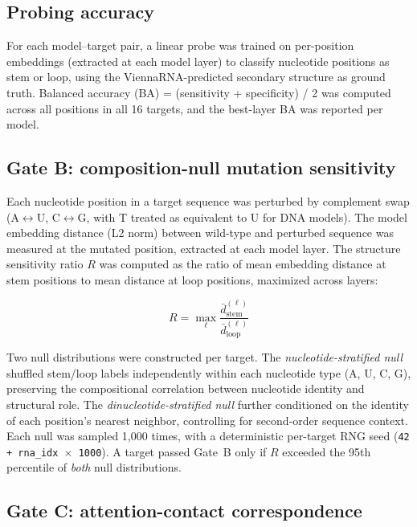 \documentclass[11pt]{article}
\begin{document}
\subsection{Probing accuracy}

For each model--target pair, a linear probe was trained on per-position
embeddings (extracted at each model layer) to classify nucleotide positions
as stem or loop, using the ViennaRNA-predicted secondary structure as ground
truth. Balanced accuracy (BA) = (sensitivity + specificity) / 2 was computed
across all positions in all 16 targets, and the best-layer BA was reported
per model.

\subsection{Gate B: composition-null mutation sensitivity}

Each nucleotide position in a target sequence was perturbed by complement
swap (A$\leftrightarrow$U, C$\leftrightarrow$G, with T treated as equivalent
to U for DNA models). The model embedding distance (L2 norm) between
wild-type and perturbed sequence was measured at the mutated position,
extracted at each model layer. The structure sensitivity ratio $R$ was
computed as the ratio of mean embedding distance at stem positions to mean
distance at loop positions, maximized across layers:

\begin{equation}
R = \max_{\ell} \frac{\bar{d}_{\text{stem}}^{(\ell)}}{\bar{d}_{\text{loop}}^{(\ell)}}
\end{equation}

Two null distributions were constructed per target. The
\emph{nucleotide-stratified null} shuffled stem/loop labels independently
within each nucleotide type (A, U, C, G), preserving the compositional
correlation between nucleotide identity and structural role. The
\emph{dinucleotide-stratified null} further conditioned on the identity of
each position's nearest neighbor, controlling for second-order sequence
context. Each null was sampled 1,000 times, with a deterministic per-target
RNG seed (\texttt{42 + rna\_idx $\times$ 1000}). A target passed Gate~B only
if $R$ exceeded the 95th percentile of \emph{both} null distributions.

\subsection{Gate C: attention-contact correspondence}
\end{document}
